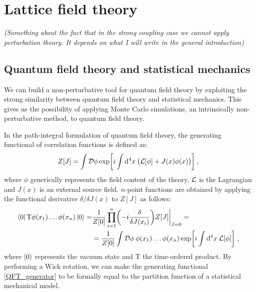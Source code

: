 \chapter{Lattice field theory}

\emph{(Something about the fact that in the strong coupling case we cannot apply perturbation theory. It depends on what I will write in the general introduction)}




\section{Quantum field theory and statistical mechanics}
\label{QFT-SM}

We can build a non-perturbative tool for quantum field theory by exploiting the strong similarity between quantum field theory and statistical mechanics. This gives us the possibility of applying Monte Carlo simulations, an intrinsically non-perturbative method, to quantum field theory.

In the path-integral formulation of quantum field theory, the generating functional of correlation functions is defined as:
\begin{equation}
Z[J] = \int \mathcal D \phi \exp \biggl[ i \int \mathrm{d}^4x \: \bigl( \mathcal L[\phi] + J(x)\phi(x) \bigr) \biggr] \: ,
\label{QFT_generator}
\end{equation}
%
where $\phi$ generically represents the field content of the theory, $\mathcal L$ is the Lagrangian and $J(x)$ is an external source field. $n$-point functions are obtained by applying the functional derivative $\delta / \delta J(x)$ to $Z[J]$ as follows:
\begin{equation}
\begin{split}
\bra{0} \mathrm T \phi(x_1) \dots \phi(x_n) \ket{0} = & \frac{1}{Z[0]} \prod_{i=1}^n \biggl( -i \frac{\delta}{\delta J(x_i)} \biggr) Z[J] \biggr\vert_{J=0} = \\
& = \frac{1}{Z[0]} \int \mathcal D \phi \: \phi(x_1) \dots \phi(x_n) \exp \biggl[ i \int \mathrm{d}^4x \: \mathcal L[\phi] \biggr] \; ,
\end{split}
\label{np_function}
\end{equation}
%
where $\ket{0}$ represents the vacuum state and T the time-ordered product.
By performing a Wick rotation, we can make the generating functional \ref{QFT_generator} to be formally equal to the partition function of a statistical mechanical model.

